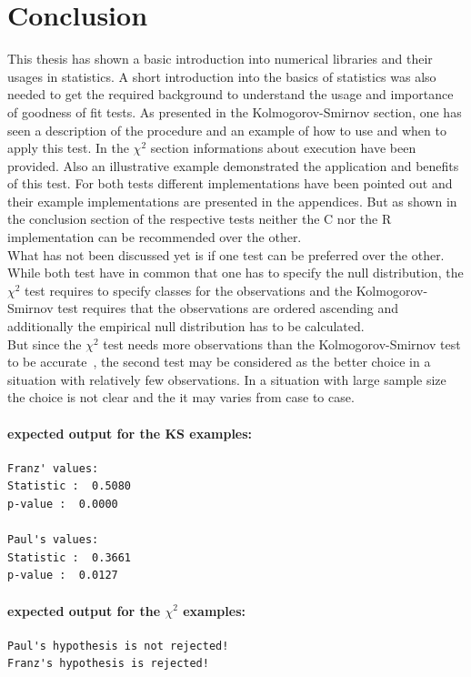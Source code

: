 \documentclass{article}
\theoremstyle{definition}
\begin{document}
\section{Conclusion}
This thesis has shown a basic introduction into numerical libraries and their usages in statistics. A short introduction into the basics of statistics was also needed to get the required background to understand the usage and importance of goodness of fit tests. As presented in the Kolmogorov-Smirnov section, one has seen a description of the procedure and an example of how to use and when to apply this test. In the $\chi^2$ section informations about execution have been provided. Also an illustrative example demonstrated the application and benefits of this test.
For both tests different implementations have been pointed out and their example implementations are presented in the appendices.
But as shown in the conclusion section of the respective tests neither the C nor the R implementation can be recommended over the other.\\
What has not been discussed yet is if one test can be preferred over the other.\\
While both test have in common that one has to specify the null distribution, the $\chi^2$ test requires to specify classes for the observations and the Kolmogorov-Smirnov test requires that the observations are ordered ascending and additionally the empirical null distribution has to be calculated.\\
But since the $\chi^2$ test needs more observations than the Kolmogorov-Smirnov test to be accurate~\cite{knuth2001art}, the second test may be considered as the better choice in a situation with relatively few observations.
In a situation with large sample size the choice is not clear and the it may varies from case to case.
\newpage
\nocite{*}



\begin{appendices}


\paragraph{expected output for the KS examples:}
\begin{verbatim}
Franz' values:
Statistic :  0.5080
p-value :  0.0000

Paul's values:
Statistic :  0.3661
p-value :  0.0127
\end{verbatim}


\paragraph{expected output for the $\chi^2$ examples:}
\begin{verbatim}
Paul's hypothesis is not rejected!
Franz's hypothesis is rejected!
\end{verbatim}
\end{appendices}
\end{document}
